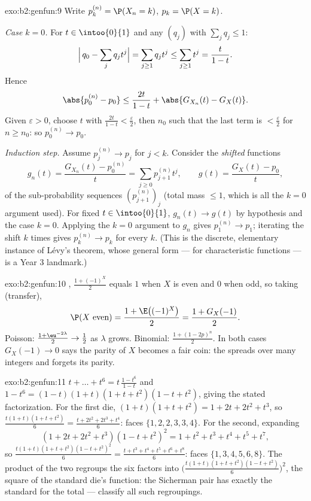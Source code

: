 \begin{solution}{exo:b2:genfun:9}
Write $p_k^{(n)} = \P(X_n = k)$, $p_k = \P(X = k)$.

\emph{Case $k = 0$.} For $t \in \intoo{0}{1}$ and any 
$(q_j)$ with $\sum_j q_j \leq 1$:
\[
\Bigl|\,q_0 - \sum_j q_jt^j\Bigr|
= \sum_{j \geq 1} q_j t^j
\leq \sum_{j\geq1}t^j = \frac{t}{1 - t} .
\]
Hence
\[
\abs{p_0^{(n)} - p_0}
\leq \frac{2t}{1 - t}
+ \abs{G_{X_n}(t) - G_X(t)} .
\]
Given $\varepsilon > 0$, choose $t$ with $\frac{2t}{1-t} <
\frac\varepsilon2$, then $n_0$ such that the last term is $<
\frac\varepsilon2$ for $n \geq n_0$: so $p_0^{(n)} \to p_0$.

\emph{Induction step.} Assume $p_j^{(n)} \to p_j$ for $j < k$.
Consider the \emph{shifted} functions
\[
g_n(t) = \frac{G_{X_n}(t) - p^{(n)}_0}{t}
= \sum_{j\geq0} p^{(n)}_{j+1}t^j,
\qquad
g(t) = \frac{G_X(t) - p_0}{t} ,
\]
 of the sub-probability sequences
$(p^{(n)}_{j+1})_j$ (total mass $\leq 1$, which is all the
$k = 0$ argument used). For fixed $t \in \intoo{0}{1}$, $g_n(t)
\to g(t)$ by hypothesis and the case $k = 0$. Applying the $k =
0$ argument to $g_n$ gives $p_1^{(n)} \to p_1$; iterating the
shift $k$ times gives $p_k^{(n)} \to p_k$ for every $k$. (This is
the discrete, elementary instance of Lévy's  theorem,
whose general form --- for characteristic functions --- is a Year
3 landmark.)
\end{solution}

\begin{solution}{exo:b2:genfun:10}
, $\frac{1 + (-1)^X}{2}$ equals $1$ when $X$ is even
and $0$ when odd, so taking  (transfer),
\[
\P(X \text{ even}) = \frac{1 + \E\bigl((-1)^X\bigr)}2 =
\frac{1 + G_X(-1)}2 .
\]
Poisson: $\frac{1 + \eu^{-2\lambda}}2 \to \frac12$ as
$\lambda$ grows. Binomial: $\frac{1 + (1 - 2p)^n}2$. In both
cases $G_X(-1) \to 0$ says the parity of $X$ becomes a fair
coin: the  spreads over many integers and forgets its
parity.
\end{solution}

\begin{solution}{exo:b2:genfun:11}
$t + \dots + t^6 = t\,\frac{1 - t^6}{1 - t}$ and $1 - t^6 =
(1 - t)(1 + t)(1 + t + t^2)(1 - t + t^2)$, giving the stated
factorization. For the first die, $(1 + t)(1 + t + t^2) = 1 +
2t + 2t^2 + t^3$, so $\frac{t(1+t)(1+t+t^2)}6 = \frac{t +
2t^2 + 2t^3 + t^4}6$: faces $\{1, 2, 2, 3, 3, 4\}$. For the
second, expanding
\[
(1 + 2t + 2t^2 + t^3)(1 - t + t^2)^2 = 1 + t^2 + t^3 + t^4 +
t^5 + t^7,
\]
so $\frac{t(1+t)(1+t+t^2)(1-t+t^2)^2}6 = \frac{t + t^3 + t^4
+ t^5 + t^6 + t^8}6$: faces $\{1, 3, 4, 5, 6, 8\}$. The
product of the two  regroups the six
factors into $\bigl(\frac{t(1+t)(1+t+t^2)(1-t+t^2)}6
\bigr)^2$, the square of the standard die's function: the
Sicherman pair has exactly the standard  for the total ---
 classify all such regroupings.
\end{solution}

